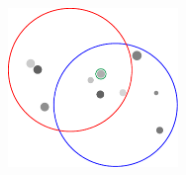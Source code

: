 \documentclass[11pt]{article}
\begin{document}
\begin{figure}[t]
\setlength{\abovecaptionskip}{0pt}

\centering







\includegraphics[width=0.4\textwidth]{imgs/Fig2_SPC.pdf}

\vspace{1em}


\end{figure}
\end{document}
